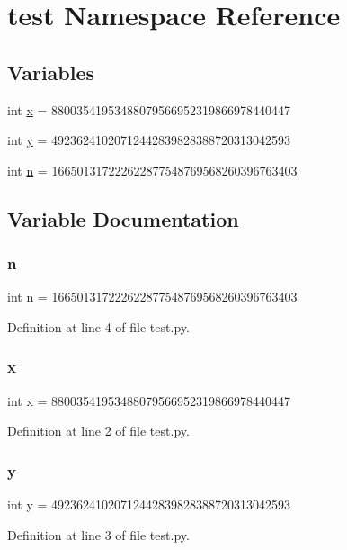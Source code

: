 \hypertarget{namespacetest}{}\section{test Namespace Reference}
\label{namespacetest}
\subsection*{Variables}
\begin{DoxyCompactItemize}
\item 
int \hyperlink{namespacetest_a6150e0515f7202e2fb518f7206ed97dc}{x} = 88003541953488079566952319866978440447
\item 
int \hyperlink{namespacetest_a0a2f84ed7838f07779ae24c5a9086d33}{y} = 49236241020712442839828388720313042593
\item 
int \hyperlink{namespacetest_a76f11d9a0a47b94f72c2d0e77fb32240}{n} = 166501317222622877548769568260396763403
\end{DoxyCompactItemize}


\subsection{Variable Documentation}
\mbox{\label{namespacetest_a76f11d9a0a47b94f72c2d0e77fb32240}} 
\subsubsection{\texorpdfstring{n}{n}}
{\footnotesize\ttfamily int n = 166501317222622877548769568260396763403}



Definition at line 4 of file test.\+py.

\mbox{\label{namespacetest_a6150e0515f7202e2fb518f7206ed97dc}} 
\subsubsection{\texorpdfstring{x}{x}}
{\footnotesize\ttfamily int x = 88003541953488079566952319866978440447}



Definition at line 2 of file test.\+py.

\mbox{\label{namespacetest_a0a2f84ed7838f07779ae24c5a9086d33}} 
\subsubsection{\texorpdfstring{y}{y}}
{\footnotesize\ttfamily int y = 49236241020712442839828388720313042593}



Definition at line 3 of file test.\+py.


